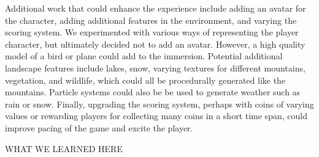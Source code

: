 \documentclass{article}
\begin{document}
Additional work that could enhance the experience include adding an avatar for the character, adding additional features in the environment, and varying the scoring system. We experimented with various ways of representing the player character, but ultimately decided not to add an avatar. However, a high quality model of a bird or plane could add to the immersion. Potential additional landscape features include lakes, snow, varying textures for different mountains, vegetation, and wildlife, which could all be procedurally generated like the mountains. Particle systems could also be be used to generate weather such as rain or snow. Finally, upgrading the scoring system, perhaps with coins of varying values or rewarding players for collecting many coins in a short time span, could improve pacing of the game and excite the player.

WHAT WE LEARNED HERE

\end{document}

